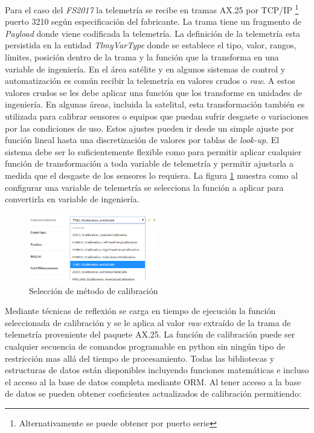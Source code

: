 \documentclass[twoside,twocolumn]{article}
\begin{document}
Para el caso del \textit{FS2017} la telemetría se recibe en tramas AX.25 por 
TCP/IP \footnote{Alternativamente se puede obtener por puerto serie} puerto 3210 
según especificación del fabricante. La trama tiene un fragmento de 
\textit{Payload} donde viene codificada la telemetría. La definición de la 
telemetría esta persistida en la entidad \textit{TlmyVarType} donde se establece 
el tipo, valor, rangos, límites, posición dentro de la trama y la función que 
la transforma en una variable de ingeniería. En el área satélite y en algunos 
sistemas de control y automatización es común recibir la telemetría en valores 
crudos o \textit{raw}. A estos valores crudos se les debe aplicar una función 
que los transforme en unidades de ingeniería. En algunas áreas, incluida la 
satelital,  esta transformación también es utilizada para calibrar sensores o 
equipos que puedan sufrir desgaste o variaciones por las condiciones de uso. 
Estos ajustes pueden ir desde un simple ajuste por función lineal hasta una 
discretización de valores por tablas de \textit{look-up}. El sistema debe ser lo 
suficientemente flexible como para permitir aplicar cualquier función de 
transformación a toda variable de telemetría y permitir ajustarla a medida que 
el desgaste de los sensores lo requiera.
La figura \ref{fig:MetodoCalibracion} muestra como al configurar una variable de telemetría se selecciona la función a aplicar para convertirla en variable de ingeniería.

\begin{figure}[]
  \caption{Selección de método de calibración}
  \label{fig:MetodoCalibracion}
  \centering
  \includegraphics[width=0.5\textwidth]{Imagenes/TTCCalibracionDiscreta.png}
\end{figure}

Mediante técnicas de reflexión se carga en tiempo de ejecución la función seleccionada de calibración y se le aplica al valor \textit{raw} extraído de la trama de telemetría proveniente del paquete AX.25. La función de calibración puede ser cualquier secuencia de comandos programable en python sin ningún tipo de restricción mas allá del tiempo de procesamiento. Todas las bibliotecas y estructuras de datos están disponibles incluyendo funciones matemáticas e incluso el acceso al la base de datos completa mediante ORM.
Al tener acceso a la base de datos se pueden obtener coeficientes actualizados de calibración permitiendo: 
\end{document}
